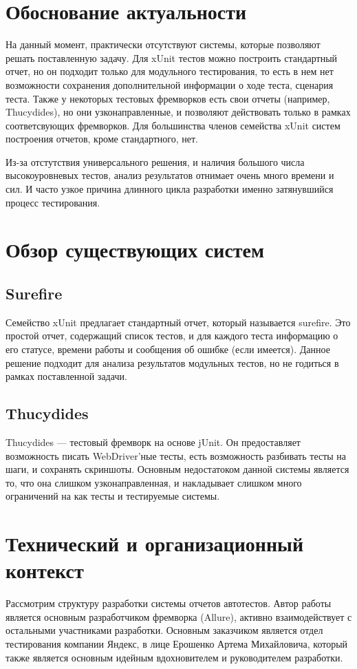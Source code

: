 \section{Обоснование актуальности}

На данный момент, практически отсутствуют системы, которые позволяют решать поставленную задачу. Для xUnit тестов можно построить стандартный отчет, но он подходит только для модульного тестирования, то есть в нем нет возможности сохранения дополнительной информации о ходе теста, сценария теста. Также у некоторых тестовых фремворков есть свои отчеты (например, Thucydides), но они узконаправленные, и позволяют действовать только в рамках соответсвующих фремворков. Для большинства членов семейства xUnit систем построения отчетов, кроме стандартного, нет.

Из-за отстутствия универсального решения, и наличия большого числа высокоуровневых тестов, анализ результатов отнимает очень много времени и сил. И часто узкое причина длинного цикла разработки именно затянувшийся процесс тестирования.

\section{Обзор существующих систем}

\subsection{Surefire}
Семейство xUnit предлагает стандартный отчет, который называется surefire. Это простой отчет, содержащий список тестов, и для каждого теста информацию о его статусе, времени работы и сообщения об ошибке (если имеется). Данное решение подходит для анализа результатов модульных тестов, но не годиться в рамках поставленной задачи.

\subsection{Thucydides}
Thucydides --- тестовый фремворк на основе jUnit. Он предоставляет возможность писать WebDriver'ные тесты, есть возможность разбивать тесты на шаги, и сохранять скриншоты. Основным недостатоком данной системы является то, что она слишком узконаправленная, и накладывает слишком много ограничений на как тесты и тестируемые системы. 

\section{Технический и организационный контекст}
Рассмотрим структуру разработки системы отчетов автотестов. Автор работы является основным разработчиком фремворка (Allure), активно взаимодействует с остальными участниками разработки. Основным заказчиком является отдел тестирования компании Яндекс, в лице Ерошенко Артема Михайловича, который также является основным идейным вдохновителем и руководителем разработки. 

